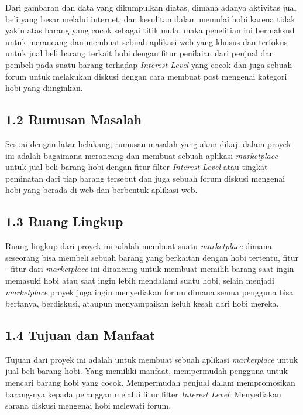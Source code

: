 \documentclass[a4paper]{article}
\begin{document}
Dari gambaran dan data yang dikumpulkan diatas, dimana adanya aktivitas jual beli yang besar melalui internet, dan kesulitan dalam memulai hobi karena tidak yakin atas barang yang cocok sebagai titik mula, maka penelitian ini bermaksud untuk merancang dan membuat sebuah aplikasi web yang khusus dan terfokus untuk jual beli barang terkait hobi dengan fitur penilaian dari penjual dan pembeli pada suatu barang terhadap \textit{Interest Level} yang cocok dan juga sebuah forum untuk melakukan diskusi dengan cara membuat post mengenai kategori hobi yang diinginkan.


\subsection*{1.2 Rumusan Masalah}

Sesuai dengan latar belakang, rumusan masalah yang akan dikaji dalam proyek ini adalah bagaimana merancang dan membuat sebuah aplikasi \textit{marketplace} untuk jual beli barang hobi dengan fitur filter \textit{Interest Level} atau tingkat peminatan dari tiap barang tersebut dan juga sebuah forum diskusi mengenai hobi yang berada di web dan berbentuk aplikasi web.

\subsection*{1.3 Ruang Lingkup}
Ruang lingkup dari proyek ini adalah membuat suatu \textit{marketplace} dimana seseorang bisa membeli sebuah barang yang berkaitan dengan hobi tertentu, fitur - fitur dari \textit{marketplace} ini dirancang untuk membuat memilih barang saat ingin memasuki hobi atau saat ingin lebih mendalami suatu hobi, selain menjadi \textit{marketplace} proyek juga ingin menyediakan forum dimana semua pengguna bisa bertanya, berdiskusi, ataupun menyampaikan keluh kesah dari hobi mereka.

\subsection*{1.4 Tujuan dan Manfaat}

Tujuan dari proyek ini adalah untuk membuat sebuah aplikasi \textit{marketplace} untuk jual beli barang hobi. Yang memiliki manfaat, mempermudah pengguna untuk mencari barang hobi yang cocok. Mempermudah penjual dalam mempromosikan barang-nya kepada pelanggan melalui fitur filter \textit{Interest Level}. Menyediakan sarana diskusi mengenai hobi melewati forum.
\end{document}
